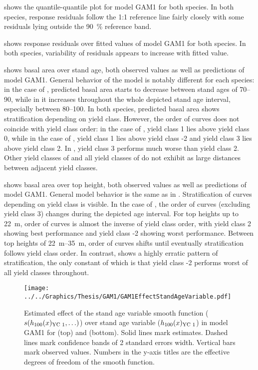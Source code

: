  shows the quantile-quantile plot for model GAM1 for both species.  In both species, response residuals follow the 1:1 reference line fairly closely with some residuals lying outside the \SI{90}{\percent} reference band.

 shows response residuals over fitted values of model GAM1 for both species.  In both species, variability of residuals appears to increase with fitted value.

 shows basal area over stand age, both observed values as well as predictions of model GAM1.  General behavior of the model is notably different for each species:  in the case of \Beech{}, predicted basal area starts to decrease between stand ages of \SIrange{70}{90}{\year}, while in \Spruce{} it increases throughout the whole depicted stand age interval, especially between \SIrange{80}{100}{\year}.  In both species, predicted basal area shows stratification depending on yield class.  However, the order of curves does not coincide with yield class order:  in the case of \Beech{}, yield class 1 lies above yield class 0, while in the case of \Spruce{}, yield class 1 lies above yield class -2 and yield class 3 lies above yield class 2.  In \Beech{}, yield class 3 performs much worse than yield class 2.  Other yield classes of \Beech{} and all yield classes of \Spruce{} do not exhibit as large distances between adjacent yield classes. 

 shows basal area over top height, both observed values as well as predictions of model GAM1.  General model behavior is the same as in .  Stratification of curves depending on yield class is visible.  In the case of \Beech{}, the order of curves (excluding yield class 3) changes during the depicted age interval.  For top heights up to \SI{22}{\meter}, order of curves is almost the inverse of yield class order, with yield class 2 showing best performance and yield class -2 showing worst performance.  Between top heights of \SIrange{22}{35}{\meter}, order of curves shifts until eventually stratification follows yield class order.  In contrast, \Spruce{} shows a highly erratic pattern of stratification, the only constant of which is that yield class -2 performs worst of all yield classes throughout.

\begin{figure}[h]
  \centering
  \texttt{[image: ../../Graphics/Thesis/GAM1/GAM1EffectStandAgeVariable.pdf]}
  \caption{Estimated effect of the stand age variable smooth function (\(s(h_{100}(x)_{\text{YC 1}}{}, \ldots)\)) over stand age variable (\(h_{100}(x)_{\text{YC 1}}{}\)) in model GAM1 for \Beech{} (top) and \Spruce{} (bottom).  Solid lines mark estimates.  Dashed lines mark confidence bands of 2 standard errors width.  Vertical bars mark observed values.  Numbers in the y-axis titles are the effective degrees of freedom of the smooth function.}
  \label{fig:GAM1EffectStandAgeVariable}
\end{figure}

